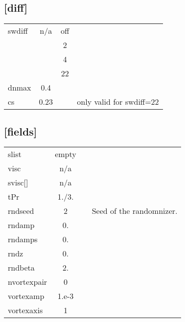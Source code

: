 \documentclass[a4paper,10pt]{extarticle}
\begin{document}
\subsection*{[diff]}
\tablelasttail{\hline}
\begin{supertabular}{lccl}
swdiff        & n/a   & off\\
              &       & 2  \\
              &       & 4  \\
              &       & 22 \\
dnmax         & 0.4   & \\
cs            & 0.23  &  & only valid for swdiff=22 \\
\end{supertabular}
\subsection*{[fields]}
\tablelasttail{\hline}
\begin{supertabular}{lccl}
slist         & empty & \\
visc          & n/a   & \\
svisc[]       & n/a   & \\
tPr           & 1./3. & \\
rndseed       & 2     & & Seed of the randomnizer. \\
rndamp        & 0.    & \\
rndamps       & 0.    & \\
rndz          & 0.    & \\
rndbeta       & 2.    & \\
nvortexpair   & 0     & \\
vortexamp     & 1.e-3 & \\
vortexaxis    & 1     & \\
\end{supertabular}
\end{document}
